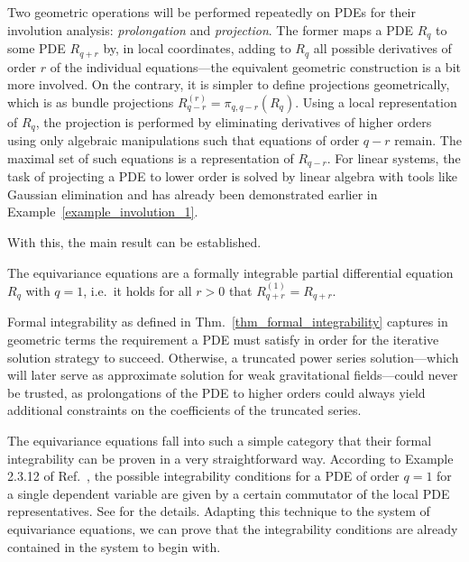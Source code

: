 Two geometric operations will be performed repeatedly on PDEs for their involution analysis: \emph{prolongation} and \emph{projection}. The former maps a PDE $R_q$ to some PDE $R_{q+r}$ by, in local coordinates, adding to $R_q$ all possible derivatives of order $r$ of the individual equations---the equivalent geometric construction is a bit more involved. On the contrary, it is simpler to define projections geometrically, which is as bundle projections $R^{(r)}_{q-r} = \pi_{q,q-r}(R_q)$. Using a local representation of $R_q$, the projection is performed by eliminating derivatives of higher orders using only algebraic manipulations such that equations of order $q-r$ remain. The maximal set of such equations is a representation of $R_{q-r}$. For linear systems, the task of projecting a PDE to lower order is solved by linear algebra with tools like Gaussian elimination and has already been demonstrated earlier in Example~\ref{example_involution_1}.

With this, the main result can be established.

\begin{theorem}\label{thm_formal_integrability}
  The equivariance equations are a formally integrable partial differential equation $R_q$ with $q=1$, i.e.\ it holds for all $r>0$ that $R^{(1)}_{q+r} = R_{q+r}$.
\end{theorem}

Formal integrability as defined in Thm.~\ref{thm_formal_integrability} captures in geometric terms the requirement a PDE must satisfy in order for the iterative solution strategy to succeed. Otherwise, a truncated power series solution---which will later serve as approximate solution for weak gravitational fields---could never be trusted, as prolongations of the PDE to higher orders could always yield additional constraints on the coefficients of the truncated series.

The equivariance equations fall into such a simple category that their formal integrability can be proven in a very straightforward way. According to Example 2.3.12 of Ref.\ \cite{Seiler_2010}, the possible integrability conditions for a PDE of order $q=1$ for a single dependent variable are given by a certain commutator of the local PDE representatives. See \cite{Seiler_2010} for the details. Adapting this technique to the system of equivariance equations, we can prove that the integrability conditions are already contained in the system to begin with.

